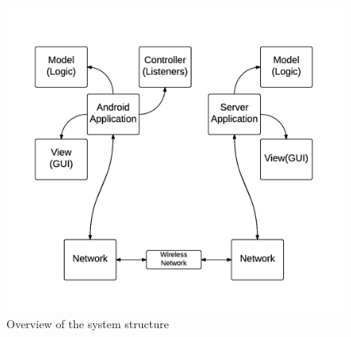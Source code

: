 \documentclass[12pt,a4paper,notitlepage]{report}
\begin{document}
\begin{figure}[ht!]
\centering
\includegraphics[width=120mm]{images/system_structure.png}
\caption{Overview of the system structure\label{system_structure}}
\end{figure}




\end{document}
